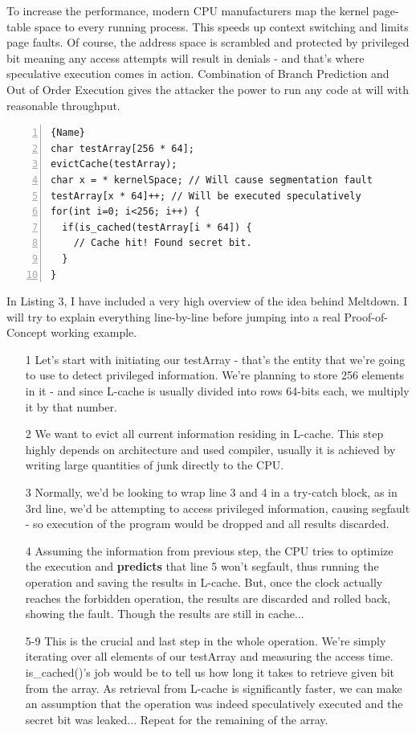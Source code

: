 \documentclass{article}
\begin{document}
To increase the performance, modern CPU manufacturers map the kernel page-table space to every running process. This speeds up context switching and limits page faults. Of course, the address space is scrambled and protected by privileged bit meaning any access attempts will result in denials - and that's where speculative execution comes in action. Combination of Branch Prediction and Out of Order Execution gives the attacker the power to run any code at will with reasonable throughput.

\begin{lstlisting}[caption=Meltdown PoC,frame=tlrb, numbers=left, firstnumber=1]{Name}
char testArray[256 * 64];
evictCache(testArray);
char x = * kernelSpace; // Will cause segmentation fault
testArray[x * 64]++; // Will be executed speculatively
for(int i=0; i<256; i++) {
  if(is_cached(testArray[i * 64]) {
    // Cache hit! Found secret bit.
  }
}
\end{lstlisting}

In Listing 3, I have included a very high overview of the idea behind Meltdown. I will try to explain everything line-by-line before jumping into a real Proof-of-Concept working example.
\begin{enumerate}

  \item [1] Let's start with initiating our testArray - that's the entity that we're going to use to detect privileged information. We're planning to store 256 elements in it - and since L-cache is usually divided into rows 64-bits each, we multiply it by that number. 
  \item [2] We want to evict all current information residing in L-cache. This step highly depends on architecture and used compiler, usually it is achieved by writing large quantities of junk directly to the CPU.
  \item [3] Normally, we'd be looking to wrap line 3 and 4 in a try-catch block, as in 3rd line, we'd be attempting to access privileged information, causing segfault - so execution of the program would be dropped and all results discarded.
  \item [4] Assuming the information from previous step, the CPU tries to optimize the execution and \textbf{predicts} that line 5 won't segfault, thus running the operation and saving the results in L-cache. But, once the clock actually reaches the forbidden operation, the results are discarded and rolled back, showing the fault. Though the results are still in cache...
  \item [5-9] This is the crucial and last step in the whole operation. We're simply iterating over all elements of our testArray and measuring the access time. is\_cached()'s job would be to tell us how long it takes to retrieve given bit from the array. As retrieval from L-cache is significantly faster, we can make an assumption that the operation was indeed speculatively executed and the secret bit was leaked... Repeat for the remaining of the array.

\end{enumerate}
\end{document}
